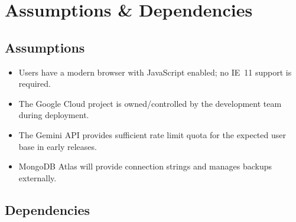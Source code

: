 \documentclass[12pt, a4paper]{article}
\begin{document}
\section{Assumptions \& Dependencies}
\label{sec:assumptions}

\subsection{Assumptions}

\begin{itemize}[leftmargin=2em]
  \item Users have a modern browser with JavaScript enabled; no IE~11 support
        is required.
  \item The Google Cloud project is owned/controlled by the development team
        during deployment.
  \item The Gemini API provides sufficient rate limit quota for the expected
        user base in early releases.
  \item MongoDB Atlas will provide connection strings and manages backups
        externally.
\end{itemize}

\subsection{Dependencies}
\end{document}

